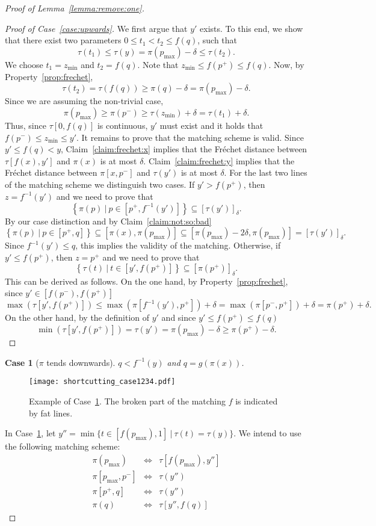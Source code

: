 \documentclass[11pt, letter]{article}
\newtheorem{case}[]{Case}
\newcommand{\lemref}[1]{Lemma~\ref{lemma:#1}}
\newcommand{\figlab}[1]{\label{fig:#1}}
\newcommand{\caselab}[1]{\label{case:#1}}
\newcommand{\caseref}[1]{Case~\ref{case:#1}}
\newcommand{\claimref}[1]{Claim~\ref{claim:#1}}
\newcommand{\propref}[1]{Property~\ref{prop:#1}}
\newcommand{\Frechet}{Fr\'echet\xspace}
\providecommand{\brc}[1]{\left\{ {#1} \right\}}
\newcommand{\setSubC}[4]{\ensuremath{\brc{ #1(#2) ~|~ #2 \in [#3,#4]} }}
\newcommand{\range}[2]{\ensuremath{[#1]_{#2}}}
\newcommand{\minSubC}[4]{\ensuremath{\min( #1[#3,#4])}}
\newcommand{\maxSubC}[4]{\ensuremath{\max( #1[#3,#4])}}
\begin{document}
\begin{proof}[Proof of \lemref{remove:one}]
\begin{proof}[Proof of \caseref{upwards}]
We first argue that $y'$ exists. To this end, we show that there exist
two parameters $0\leq t_1 < t_2 \leq  f(q)$, such that
\[ \tau(t_1) \leq \tau(y) = \pi(p_{\max})-\delta \leq \tau(t_2). \]
We choose $t_1=z_{\min}$ and $t_2=f(q)$.
Note that $z_{\min} \leq f(p^{+}) \leq f(q)$.
Now, by \propref{frechet},
\[\tau(t_2) = \tau(f(q)) \geq \pi(q)-\delta = \pi(p_{\max})-\delta.\] 
Since we are assuming the non-trivial case, 
\[ \pi(p_{\max}) \geq \pi(p^{-}) \geq \tau(z_{\min}) + \delta = \tau(t_1) + \delta. \] 
Thus, since $\tau[0,f(q)]$ is continuous, $y'$ must exist and it holds that $f(p^{-}) \leq z_{\min} \leq y'$.
It remains to prove that the matching scheme is valid.
Since $y'\leq f(q) < y$,
\claimref{frechet:x} implies that the \Frechet distance between $\tau[f(x),y']$
and $\pi(x)$ is at most $\delta$.
\claimref{frechet:y} implies that the \Frechet distance between $\pi[x,p^{-}]$
and $\tau(y')$ is at most $\delta$.
For the last two lines of the matching scheme we distinguish two cases.
If $y' > f(p^{+})$, then $z=f^{-1}(y')$ and we need to prove that
\[ \setSubC{\pi}{p}{p^{+}}{f^{-1}(y')} \subseteq \range{\tau(y')}{\delta}. \]
By our case distinction and by \claimref{not:so:bad}
\[ \setSubC{\pi}{p}{p^{+}}{q} \subseteq [\pi(x), \pi(p_{\max})] 
\subseteq [\pi(p_{\max})-2\delta, \pi(p_{\max})] = \range{\tau(y')}{\delta}. \]
Since $f^{-1}(y') \leq q$, this implies the validity of the matching.
Otherwise, if $y' \leq f(p^{+})$, then $z=p^{+}$ and we need to prove 
that 
\[ \setSubC{\tau}{t}{y'}{f(p^{+})} \subseteq \range{\pi(p^{+})}{\delta}. \]
This can be derived as follows. On the one hand, by \propref{frechet}, since $y'\in [f(p^{-}),f(p^{+})]$
\[\maxSubC{\tau}{t}{y'}{f(p^{+})} 
\leq \maxSubC{\pi}{p}{f^{-1}(y')}{p^{+}}+\delta 
= \maxSubC{\pi}{p}{p^{-}}{p^{+}}+\delta 
= \pi(p^{+})+\delta. \]
On the other hand, by the definition of $y'$ and since $y' \leq f(p^{+}) \leq f(q)$
\[\minSubC{\tau}{t}{y'}{f(p^{+})} = \tau(y') = \pi(p_{\max})-\delta \geq \pi(p^{+}) -\delta. \]
\end{proof}

\begin{case}[$\pi$ tends downwards]
$q < f^{-1}(y)$ and $q=g(\pi(x))$.
\caselab{downwards}
\end{case}
\begin{figure}[h]\centering
\texttt{[image: shortcutting\_case1234.pdf]}\\
\caption{Example of \caseref{downwards}. The broken part of the matching $f$ is indicated by fat lines.}
\figlab{shortcutting:case4}
\end{figure}
In \caseref{downwards}, let $y''=\min\{ t \in [f(p_{\max}),1] ~|~ \tau(t) =
\tau(y) \}$. 
We intend to use the following matching scheme:
\begin{eqnarray*}
\pi(p_{\max}) &\Leftrightarrow& \tau[f(p_{\max}), y'']\\
\pi[p_{\max},p^{-}] &\Leftrightarrow& \tau(y'')\\
\pi[p^{+},q] &\Leftrightarrow& \tau(y'')\\
\pi(q) &\Leftrightarrow& \tau[y'',f(q)]
\end{eqnarray*}


\end{proof}
\end{document}
